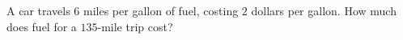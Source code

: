A car travels $6$ miles per gallon of fuel, costing $2$ dollars per gallon. How much does fuel for a $135$-mile trip cost?
